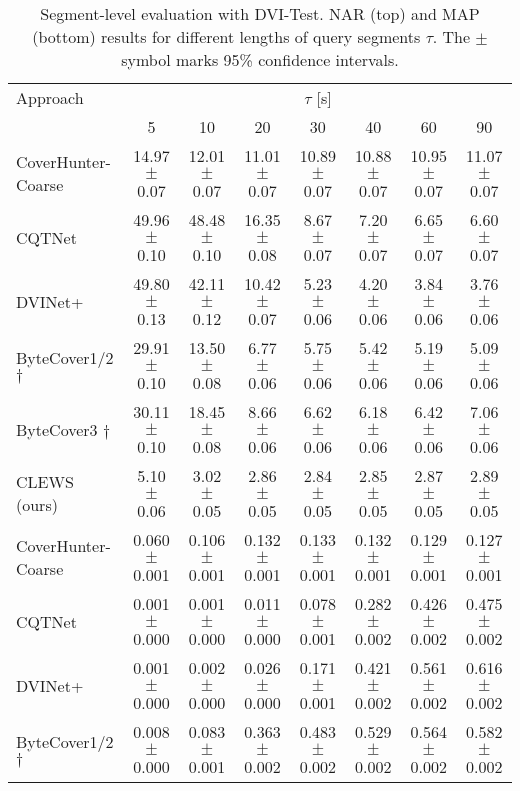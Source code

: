 \vfill

\begin{table*}[h]
\caption{Segment-level evaluation with DVI-Test. NAR (top) and MAP (bottom) results for different lengths of query segments $\tau$. The $\pm$ symbol marks 95\% confidence intervals.}
\label{tab:seg_dvi}
\vskip 0.15in
\begin{adjustbox}{max width=\textwidth}
\begin{sc}
\begin{tabular}{lccccccc}
\toprule
Approach & \multicolumn{7}{c}{$\tau$ [s]} \\
        \cline{2-8}
    & 5 & 10 & 20 & 30 & 40 & 60 & 90 \\
\midrule
CoverHunter-Coarse & 14.97 $\pm$ 0.07 & 12.01 $\pm$ 0.07 & 11.01 $\pm$ 0.07 & 10.89 $\pm$ 0.07 & 10.88 $\pm$ 0.07 & 10.95 $\pm$ 0.07 & 11.07 $\pm$ 0.07 \\
CQTNet & 49.96 $\pm$ 0.10 & 48.48 $\pm$ 0.10 & 16.35 $\pm$ 0.08 & 8.67 $\pm$ 0.07 & 7.20 $\pm$ 0.07 & 6.65 $\pm$ 0.07 & 6.60 $\pm$ 0.07 \\
DVINet+ & 49.80 $\pm$ 0.13 & 42.11 $\pm$ 0.12 & 10.42 $\pm$ 0.07 & 5.23 $\pm$ 0.06 & 4.20 $\pm$ 0.06 & 3.84 $\pm$ 0.06 & 3.76 $\pm$ 0.06 \\
ByteCover1/2 $\dag$ & 29.91 $\pm$ 0.10 & 13.50 $\pm$ 0.08 & 6.77 $\pm$ 0.06 & 5.75 $\pm$ 0.06 & 5.42 $\pm$ 0.06 & 5.19 $\pm$ 0.06 & 5.09 $\pm$ 0.06 \\
ByteCover3 $\dag$ & 30.11 $\pm$ 0.10 & 18.45 $\pm$ 0.08 & 8.66 $\pm$ 0.06 & 6.62 $\pm$ 0.06 & 6.18 $\pm$ 0.06 & 6.42 $\pm$ 0.06 & 7.06 $\pm$ 0.06 \\
CLEWS (ours) & 5.10 $\pm$ 0.06 & 3.02 $\pm$ 0.05 & 2.86 $\pm$ 0.05 & 2.84 $\pm$ 0.05 & 2.85 $\pm$ 0.05 & 2.87 $\pm$ 0.05 & 2.89 $\pm$ 0.05 \\
\midrule
CoverHunter-Coarse & 0.060 $\pm$ 0.001 & 0.106 $\pm$ 0.001 & 0.132 $\pm$ 0.001 & 0.133 $\pm$ 0.001 & 0.132 $\pm$ 0.001 & 0.129 $\pm$ 0.001 & 0.127 $\pm$ 0.001 \\
CQTNet & 0.001 $\pm$ 0.000 & 0.001 $\pm$ 0.000 & 0.011 $\pm$ 0.000 & 0.078 $\pm$ 0.001 & 0.282 $\pm$ 0.002 & 0.426 $\pm$ 0.002 & 0.475 $\pm$ 0.002 \\
DVINet+ & 0.001 $\pm$ 0.000 & 0.002 $\pm$ 0.000 & 0.026 $\pm$ 0.000 & 0.171 $\pm$ 0.001 & 0.421 $\pm$ 0.002 & 0.561 $\pm$ 0.002 & 0.616 $\pm$ 0.002 \\
ByteCover1/2 $\dag$ & 0.008 $\pm$ 0.000 & 0.083 $\pm$ 0.001 & 0.363 $\pm$ 0.002 & 0.483 $\pm$ 0.002 & 0.529 $\pm$ 0.002 & 0.564 $\pm$ 0.002 & 0.582 $\pm$ 0.002 \\

\end{tabular}
\end{sc}
\end{adjustbox}
\end{table*}
